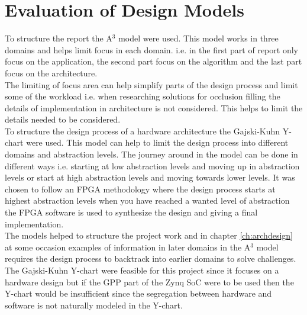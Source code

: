 \section*{Evaluation of Design Models}
To structure the report the A$^3$ model were used. This model works in three domains and helps limit focus in each domain. i.e. in the first part of report only focus on the application, the second part focus on the algorithm and the last part focus on the architecture.\\
The limiting of focus area can help simplify parts of the design process and limit some of the workload i.e. when researching solutions for occlusion filling the details of implementation in architecture is not considered. This helps to limit the details needed to be considered.\\

To structure the design process of a hardware architecture the Gajski-Kuhn Y-chart were used. This model can help to limit the design process into different domains and abstraction levels. The journey around in the model can be done in different ways i.e. starting at low abstraction levels and moving up in abstraction levels or start at high abstraction levels and moving towards lower levels. It was chosen to follow an FPGA methodology where the design process starts at highest abstraction levels when you have reached a wanted level of abstraction the FPGA software is used to synthesize the design and giving a final implementation. \\

The models helped to structure the project work and in chapter \vref{ch:archdesign} at some occasion examples of information in later domains in the A$^3$ model requires the design process to backtrack into earlier domains to solve challenges. \\

The Gajski-Kuhn Y-chart were feasible for this project since it focuses on a hardware design but if the GPP part of the Zynq SoC were to be used then the Y-chart would be insufficient since the segregation between hardware and software is not naturally modeled in the Y-chart.\\


